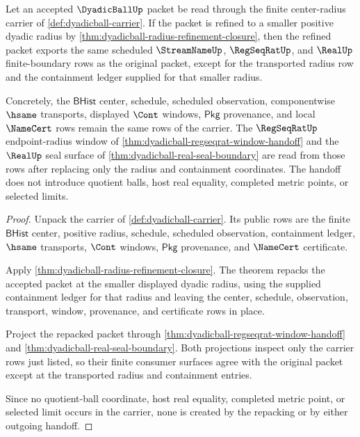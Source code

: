 \begin{theorem}
\label{thm:dyadicball-intersection-refinement-handoff}
Let an accepted $\DyadicBallUp$ packet be read through the finite
center-radius carrier of \autoref{def:dyadicball-carrier}. If the packet is
refined to a smaller positive dyadic radius by
\autoref{thm:dyadicball-radius-refinement-closure}, then the refined packet
exports the same scheduled $\StreamNameUp$, $\RegSeqRatUp$, and $\RealUp$
finite-boundary rows as the original packet, except for the transported radius
row and the containment ledger supplied for that smaller radius.

Concretely, the $\mathsf{BHist}$ center, schedule, scheduled observation,
componentwise $\hsame$ transports, displayed $\Cont$ windows, $\mathsf{Pkg}$
provenance, and local $\NameCert$ rows remain the same rows of the carrier.
The $\RegSeqRatUp$ endpoint-radius window of
\autoref{thm:dyadicball-regseqrat-window-handoff} and the $\RealUp$ seal
surface of \autoref{thm:dyadicball-real-seal-boundary} are read from those
rows after replacing only the radius and containment coordinates. The handoff
does not introduce quotient balls, host real equality, completed metric
points, or selected limits.
\end{theorem}
\begin{proof}
Unpack the carrier of \autoref{def:dyadicball-carrier}. Its public rows are the
finite $\mathsf{BHist}$ center, positive radius, schedule, scheduled
observation, containment ledger, $\hsame$ transports, $\Cont$ windows,
$\mathsf{Pkg}$ provenance, and $\NameCert$ certificate.

Apply \autoref{thm:dyadicball-radius-refinement-closure}. The theorem repacks
the accepted packet at the smaller displayed dyadic radius, using the supplied
containment ledger for that radius and leaving the center, schedule,
observation, transport, window, provenance, and certificate rows in place.

Project the repacked packet through
\autoref{thm:dyadicball-regseqrat-window-handoff} and
\autoref{thm:dyadicball-real-seal-boundary}. Both projections inspect only the
carrier rows just listed, so their finite consumer surfaces agree with the
original packet except at the transported radius and containment entries.

Since no quotient-ball coordinate, host real equality, completed metric point,
or selected limit occurs in the carrier, none is created by the repacking or by
either outgoing handoff.
\end{proof}

